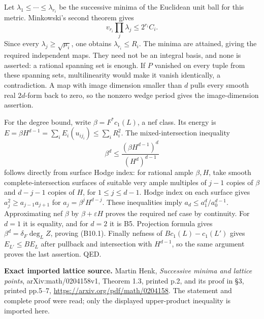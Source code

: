 \documentclass[11pt,a4paper]{article}
\theoremstyle{definition}
\begin{document}
Let \(\lambda_1\le\cdots\le\lambda_{r_i}\) be the successive minima of the Euclidean unit ball for this metric. Minkowski's second theorem gives \[
 v_{r_i}\prod_j\lambda_j\le 2^{r_i}C_i.
\] Since every \(\lambda_j\ge\sqrt{\mu_i}\), one obtains \(\lambda_{r_i}\le R_i\). The minima are attained, giving the required independent maps. They need not be an integral basis, and none is asserted: a rational spanning set is enough. If \(P\) vanished on every tuple from these spanning sets, multilinearity would make it vanish identically, a contradiction. A map with image dimension smaller than \(d\) pulls every smooth real \(2d\)-form back to zero, so the nonzero wedge period gives the image-dimension assertion.

For the degree bound, write \(\beta=F^*c_1(L)\), a nef class. Its energy is \(E=\beta H^{d-1}=\sum_iE_i(u_{ij_i})\le\sum_iR_i^2\). The mixed-intersection inequality \[
 \beta^d\le\frac{(\beta H^{d-1})^d}{(H^d)^{d-1}}
\tag{B10.2}
\] follows directly from surface Hodge index: for rational ample \(\beta,H\), take smooth complete-intersection surfaces of suitable very ample multiples of \(j-1\) copies of \(\beta\) and \(d-j-1\) copies of \(H\), for \(1\le j\le d-1\). Hodge index on each surface gives \(a_j^2\ge a_{j-1}a_{j+1}\) for \(a_j=\beta^jH^{d-j}\). These inequalities imply \(a_d\le a_1^d/a_0^{d-1}\). Approximating nef \(\beta\) by \(\beta+\varepsilon H\) proves the required nef case by continuity. For \(d=1\) it is equality, and for \(d=2\) it is B5. Projection formula gives \(\beta^d=\delta_F\deg_L Z\), proving (B10.1). Finally nefness of \(Bc_1(L)-c_1(L')\) gives \(E_{L'}\le B E_L\) after pullback and intersection with \(H^{d-1}\), so the same argument proves the last assertion. QED.

\textbf{Exact imported lattice source.} Martin Henk, \emph{Successive minima and lattice points}, arXiv:math/0204158v1, Theorem 1.3, printed p.2, and its proof in §3, printed pp.5--7, \url{https://arxiv.org/pdf/math/0204158}. The statement and complete proof were read; only the displayed upper-product inequality is imported here.
\end{document}

